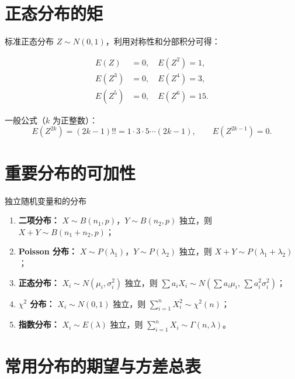 \section{正态分布的矩}

标准正态分布 $Z \sim N(0,1)$，利用对称性和分部积分可得：
\begin{myformula}
\[
\begin{aligned}
    E(Z) &= 0, \quad E(Z^2) = 1, \\
    E(Z^3) &= 0, \quad E(Z^4) = 3, \\
    E(Z^5) &= 0, \quad E(Z^6) = 15.
\end{aligned}
\]
\end{myformula}

一般公式（$k$ 为正整数）：
\[E(Z^{2k}) = (2k-1)!! = 1 \cdot 3 \cdot 5 \cdots (2k-1),\qquad
E(Z^{2k-1}) = 0.\]

\section{重要分布的可加性}

\begin{myproperty}{独立随机变量和的分布}
\begin{enumerate}
	\item \textbf{二项分布：} $X \sim B(n_1, p)$，$Y \sim B(n_2, p)$ 独立，则 $X + Y \sim B(n_1 + n_2, p)$；
	\item \textbf{Poisson 分布：} $X \sim P(\lambda_1)$，$Y \sim P(\lambda_2)$ 独立，则 $X + Y \sim P(\lambda_1 + \lambda_2)$；
	\item \textbf{正态分布：} $X_i \sim N(\mu_i, \sigma_i^2)$ 独立，则 $\sum a_i X_i \sim N(\sum a_i \mu_i,\, \sum a_i^2 \sigma_i^2)$；
	\item \textbf{$\chi^2$ 分布：} $X_i \sim N(0, 1)$ 独立，则 $\sum_{i=1}^{n} X_i^2 \sim \chi^2(n)$；
	\item \textbf{指数分布：} $X_i \sim E(\lambda)$ 独立，则 $\sum_{i=1}^{n} X_i \sim \Gamma(n, \lambda)$。
\end{enumerate}
\end{myproperty}

\section{常用分布的期望与方差总表}

